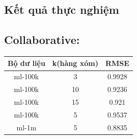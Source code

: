 \documentclass[a0,portrait,11pt]{a0poster}
\begin{document}
\begin{mybox}
\section*{Kết quả thực nghiệm}
\begin{multicols}{3}
\begin{mybox}
\subsection*{Collaborative:}
\begin{center}
\begin{tabular}{|c|c|c|}
\hline
Bộ dư liệu & k(hàng xóm) & RMSE \\ 
\hline
ml-100k & 3 &  0.9928 \\
ml-100k & 10 &  0.9236\\
ml-100k & 15 &  0.921\\
ml-100k & 5 & 0.9537 \\
ml-1m & 5 & 0.8835 \\
\hline
\end{tabular}
\end{center}
\end{mybox}
\begin{mybox}

\end{mybox}
\end{multicols}
\end{mybox}
\end{document}
